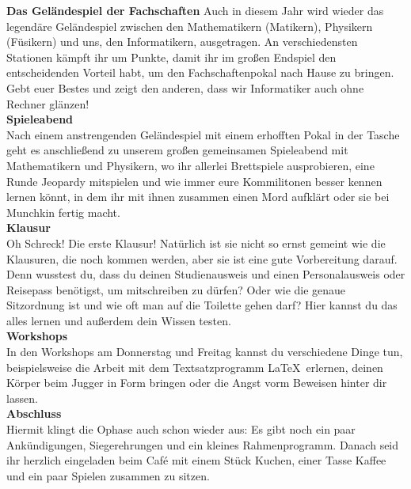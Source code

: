 {    \noindent\textbf{Das Geländespiel der Fachschaften}
    Auch in diesem Jahr wird wieder das legendäre Geländespiel zwischen den Mathematikern (Matikern), Physikern (Füsikern) und uns, den Informatikern, ausgetragen. An verschiedensten Stationen kämpft ihr um Punkte, damit ihr im großen Endspiel den entscheidenden Vorteil habt, um den Fachschaftenpokal nach Hause zu bringen. Gebt euer Bestes und zeigt den anderen, dass wir Informatiker auch ohne Rechner glänzen!\\

    \noindent\textbf{Spieleabend}\\
    Nach einem anstrengenden Geländespiel mit einem erhofften Pokal in der Tasche geht es anschließend zu unserem großen gemeinsamen Spieleabend mit Mathematikern und Physikern, wo ihr allerlei Brettspiele ausprobieren, eine Runde Jeopardy mitspielen und wie immer eure Kommilitonen besser kennen lernen könnt, in dem ihr mit ihnen zusammen einen Mord aufklärt oder sie bei Munchkin fertig macht. \\


    \noindent\textbf{Klausur}\\
    Oh Schreck! Die erste Klausur! Natürlich ist sie nicht so ernst gemeint wie die Klausuren, die noch kommen werden, aber sie ist eine gute Vorbereitung darauf. Denn wusstest du, dass du deinen Studienausweis und einen Personalausweis oder Reisepass benötigst, um mitschreiben zu dürfen? Oder wie die genaue Sitzordnung ist und wie oft man auf die Toilette gehen darf? Hier kannst du das alles lernen und außerdem dein Wissen testen.\\


    \noindent\textbf{Workshops}\\
    In den Workshops am Donnerstag und Freitag kannst du verschiedene Dinge tun, beispielsweise die Arbeit mit dem Textsatzprogramm \LaTeX~erlernen, deinen Körper beim Jugger in Form bringen oder die Angst vorm Beweisen hinter dir lassen.\\

    \noindent\textbf{Abschluss}\\
    Hiermit klingt die Ophase auch schon wieder aus: Es gibt noch ein paar Ankündigungen, Siegerehrungen und ein kleines Rahmenprogramm. Danach seid ihr herzlich eingeladen beim Caf\'e mit einem Stück Kuchen, einer Tasse Kaffee und ein paar Spielen zusammen zu sitzen.
}{}

\newpage
